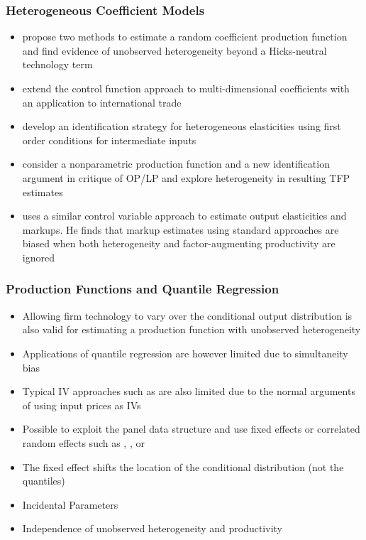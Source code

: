 \documentclass{beamer}
\begin{document}

\begin{frame}
\frametitle{Heterogeneous Coefficient Models}
\begin{itemize}
	\item \textcite{Kasahara2015} propose two methods to estimate a random coefficient production function and find evidence of unobserved heterogeneity beyond a Hicks-neutral technology term
	\item \textcite{balat} extend the control function approach to multi-dimensional coefficients with an application to international trade
	\item \textcite{Li2017} develop an identification strategy for heterogeneous elasticities using first order conditions for intermediate inputs
	\item \textcite{Gandhi2020} consider a nonparametric production function and a new identification argument in critique of OP/LP and explore heterogeneity in resulting TFP estimates
	\item \textcite{mert} uses a similar control variable approach to estimate output elasticities and markups. He finds that markup estimates using standard approaches are biased when both heterogeneity and factor-augmenting productivity are ignored
\end{itemize}
\end{frame}

\begin{frame}
\frametitle{Production Functions and Quantile Regression}
\begin{itemize}
	\item Allowing firm technology to vary over the conditional output distribution is also valid for estimating a production function with unobserved heterogeneity
	\item Applications of quantile regression are however limited due to simultaneity bias
	\item Typical IV approaches such as \textcite{Chernozhukov2005} are also limited due to the normal arguments of using input prices as IVs
	\item Possible to exploit the panel data structure and use fixed effects or correlated random effects such as \textcite{Koenker2004}, \textcite{Lamarche2010}, or \textcite{Canay2011}
	\item The fixed effect shifts the location of the conditional distribution (not the quantiles)
	\item Incidental Parameters 
	\item Independence of unobserved heterogeneity and productivity 
\end{itemize}
\end{frame}
\end{document}
